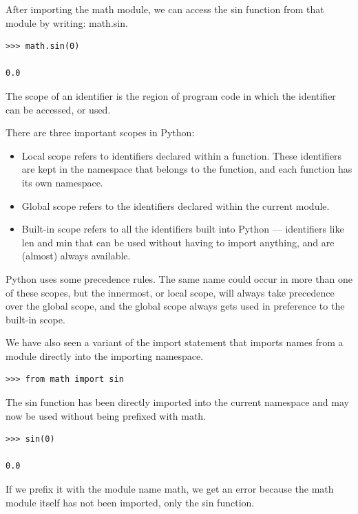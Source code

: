 \documentclass{article}
\begin{document}
After importing the math module, we can access the sin function from that module by writing: math.sin.

\begin{lstlisting}
>>> math.sin(0)

0.0
\end{lstlisting}

The scope of an identifier is the region of program code in which the identifier can be accessed, or used.

There are three important scopes in Python:

\begin{itemize}
\item Local scope refers to identifiers declared within a function. These identifiers are kept in the namespace that belongs to the function, and each function has its own namespace.

\item Global scope refers to the identifiers declared within the current module.

\item Built-in scope refers to all the identifiers built into Python — identifiers like len and min that can be used without having to import anything, and are (almost) always available.
\end{itemize}

Python uses some precedence rules. The same name could occur in more than one of these scopes, but the innermost, or local scope, will always take precedence over the global scope, and the global scope always gets used in preference to the built-in scope.

We have also seen a variant of the import statement that imports names from a module directly into the importing namespace. 

\begin{lstlisting}
>>> from math import sin
\end{lstlisting}

The sin function has been directly imported into the current namespace and may now be used without being prefixed with math.

\begin{lstlisting}
>>> sin(0)

0.0
\end{lstlisting}

If we prefix it with the module name math, we get an error because the math module itself has not been imported, only the sin function.
\end{document}
